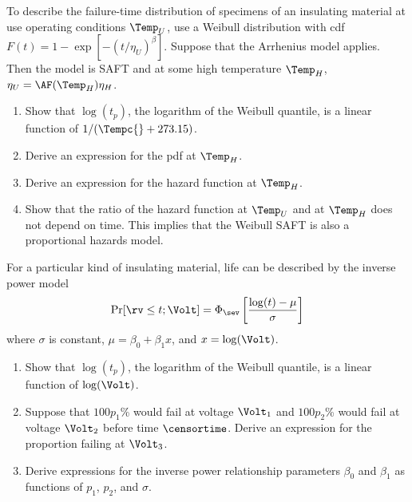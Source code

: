 \begin{exercise1}
To describe the failure-time distribution of specimens of an
insulating material at use operating conditions $\Temp_{U}$, use a
Weibull distribution with cdf $F(t)=
1-\exp[-(t/\eta_{U})^\beta]$. Suppose that the Arrhenius model
applies. Then the model is SAFT and at some high temperature
$\Temp_{H}$, $\eta_{U} = \AF(\Temp_{H})
\eta_{H} $.
\begin{enumerate}
\item
Show that  $\log(t_{p})$, the logarithm of the Weibull quantile, is a linear
function of $1/(\Tempc{} +273.15)$.
\item
Derive an expression for the pdf at $\Temp_{H}$.
\item
Derive an expression for the hazard function at $\Temp_{H}$.
\item
Show that the ratio of the hazard function at $\Temp_{U}$
and at $\Temp_{H}$ does not depend on time. This implies that
the Weibull SAFT is also a proportional hazards model.
\end{enumerate}
\end{exercise1}


\begin{exercise}
For a particular kind of insulating material, life can be
described by the inverse power model 
\begin{displaymath}
\Pr[\rv\leq t;\Volt] = \Phi_{\sev}\left[\frac{\log(t)-\mu}{\sigma} \right]
\end{displaymath}
where $\sigma$ is constant, $\mu = \beta_{0}+ \beta_{1} x$, and
$x=\log(\Volt)$.
\begin{enumerate}
\item
Show that  $\log(t_{p})$, the logarithm of the Weibull quantile, is a linear
function of $\log(\Volt)$.
\item
Suppose that $100p_{1}$\% would fail at voltage $\Volt_{1}$
and $100p_{2}$\% would fail at voltage $\Volt_{2}$ before time
$\censortime$. Derive an expression for the proportion failing at
$\Volt_{3}$.
\item
Derive expressions
for the inverse power relationship parameters $\beta_{0}$ and
$\beta_{1}$
as functions of $p_{1}$, $p_{2}$, and $\sigma$.
\end{enumerate}
\end{exercise}

